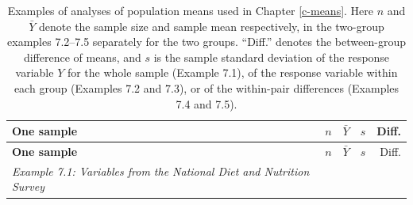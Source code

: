 \documentclass[11pt,a4paper,openany]{book}
\begin{document}
\begin{longtable}[]{@{}lrrrr@{}}
\caption{\label{tab:t-groupex} Examples of analyses of population means used
in Chapter \ref{c-means}. Here \(n\) and \(\bar{Y}\) denote the sample
size and sample mean respectively, in the two-group examples 7.2--7.5
separately for the two groups. ``Diff.'' denotes the between-group
difference of means, and \(s\) is the sample standard deviation of the
response variable \(Y\) for the whole sample (Example 7.1), of the
response variable within each group (Examples 7.2 and 7.3), or of the
within-pair differences (Examples 7.4 and 7.5).}\tabularnewline
\toprule
\begin{minipage}[b]{0.55\columnwidth}\raggedright\strut
\textbf{One sample}\strut
\end{minipage} & \begin{minipage}[b]{0.06\columnwidth}\raggedleft\strut
\(n\)\strut
\end{minipage} & \begin{minipage}[b]{0.10\columnwidth}\raggedleft\strut
\(\bar{Y}\)\strut
\end{minipage} & \begin{minipage}[b]{0.07\columnwidth}\raggedleft\strut
\(s\)\strut
\end{minipage} & \begin{minipage}[b]{0.08\columnwidth}\raggedleft\strut
Diff.\strut
\end{minipage}\tabularnewline
\midrule
\endfirsthead
\toprule
\begin{minipage}[b]{0.55\columnwidth}\raggedright\strut
\textbf{One sample}\strut
\end{minipage} & \begin{minipage}[b]{0.06\columnwidth}\raggedleft\strut
\(n\)\strut
\end{minipage} & \begin{minipage}[b]{0.10\columnwidth}\raggedleft\strut
\(\bar{Y}\)\strut
\end{minipage} & \begin{minipage}[b]{0.07\columnwidth}\raggedleft\strut
\(s\)\strut
\end{minipage} & \begin{minipage}[b]{0.08\columnwidth}\raggedleft\strut
Diff.\strut
\end{minipage}\tabularnewline
\midrule
\endhead
\begin{minipage}[t]{0.55\columnwidth}\raggedright\strut
\emph{Example 7.1: Variables from the National Diet and Nutrition
Survey}\strut
\end{minipage} & \begin{minipage}[t]{0.06\columnwidth}\raggedleft\strut

\end{minipage}
\end{longtable}
\end{document}
